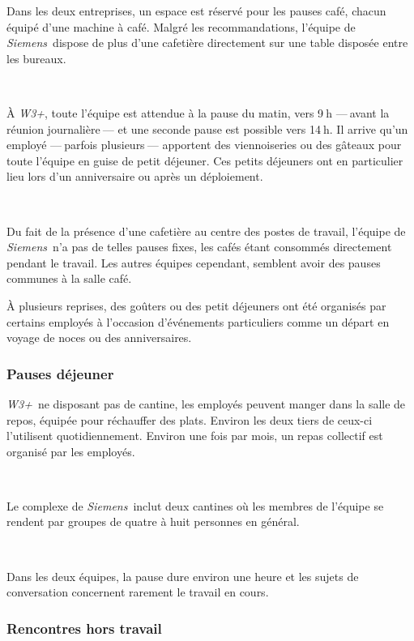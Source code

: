 \documentclass[a4paper, oneside, 12pt]{article}
\def\www{\emph{W3+}}
\def\siemens{\emph{Siemens}}
\begin{document}
Dans les deux entreprises, un espace est réservé pour les pauses café, chacun équipé d’une machine à café. Malgré les recommandations, l’équipe de \siemens\ dispose de plus d’une cafetière directement sur une table disposée entre les bureaux.

\ 

À \www, toute l’équipe est attendue à la pause du matin, vers 9$~$h —$~$avant la réunion journalière$~$— et une seconde pause est possible vers 14$~$h. Il arrive qu’un employé —$~$parfois plusieurs$~$— apportent des viennoiseries ou des gâteaux pour toute l’équipe en guise de petit déjeuner. Ces petits déjeuners ont en particulier lieu lors d’un anniversaire ou après un déploiement.

\ 

Du fait de la présence d’une cafetière au centre des postes de travail, l’équipe de \siemens\ n’a pas de telles pauses fixes, les cafés étant consommés directement pendant le travail. Les autres équipes cependant, semblent avoir des pauses communes à la salle café.

À plusieurs reprises, des goûters ou des petit déjeuners ont été organisés par certains employés à l’occasion d’événements particuliers comme un départ en voyage de noces ou des anniversaires.

\vfill

\newpage

\subsubsection{Pauses déjeuner}

\www\ ne disposant pas de cantine, les employés peuvent manger dans la salle de repos, équipée pour réchauffer des plats. Environ les deux tiers de ceux-ci l’utilisent quotidiennement. Environ une fois par mois, un repas collectif est organisé par les employés.

\ 

Le complexe de \siemens\ inclut deux cantines où les membres de l’équipe se rendent par groupes de quatre à huit personnes en général.

\ 

Dans les deux équipes, la pause dure environ une heure et les sujets de conversation concernent rarement le travail en cours.

\subsubsection{Rencontres hors travail}
\end{document}
